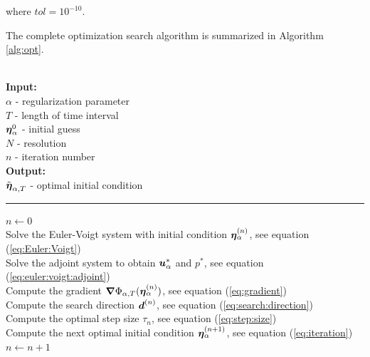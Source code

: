 where $tol = 10^{-10}$. {\color{red}The complete optimization search algorithm is summarized in Algorithm \ref{alg:opt}.


\begin{algorithm}
\caption{Solution of Problem \ref{eq:problem} for initial guess $\beza$ and fixed $\alpha$ and $T$.}\label{alg:opt}

\,\\
\textbf{Input:} \\
\hspace*{\algorithmicindent} $\alpha$ - regularization parameter\\
\hspace*{\algorithmicindent} $T$ - length of time interval\\
\hspace*{\algorithmicindent} $\beza$ - initial guess\\
\hspace*{\algorithmicindent} $N$ - resolution\\
\hspace*{\algorithmicindent} $n$ - iteration number\\
\textbf{Output:}\\
\hspace*{\algorithmicindent} ${\tilde{\boldsymbol \eta}_{\alpha,T}}$ - optimal initial condition\\
\hrule

\begin{algorithmic}

\State $n \gets 0$
\\
\hspace*{\algorithmicindent} Solve the Euler-Voigt system with initial condition ${\boldsymbol \eta_\alpha^{(n)}}$, see equation (\ref{eq:Euler:Voigt})\\
\hspace*{\algorithmicindent} Solve the adjoint system to obtain $\boldsymbol u^*_\alpha$ and $p^*$, see equation (\ref{eq:euler:voigt:adjoint}) \\
\hspace*{\algorithmicindent} Compute the gradient ${\boldsymbol \nabla} \Phi_{\alpha,T}({\boldsymbol \eta_\alpha^{(n)}})$, see equation (\ref{eq:gradient}) \\
\hspace*{\algorithmicindent} Compute the search direction $\boldsymbol d^{(n)}$, see equation (\ref{eq:search:direction}) \\
\hspace*{\algorithmicindent} Compute the optimal step size $\tau_n$, see equation (\ref{eq:step:size}) \\
\hspace*{\algorithmicindent} Compute the next optimal initial condition ${\boldsymbol \eta_\alpha^{(n+1)}}$, see equation (\ref{eq:iteration}) \\
\hspace*{\algorithmicindent} $n \gets n+1$


\end{algorithmic}
\end{algorithm}}
